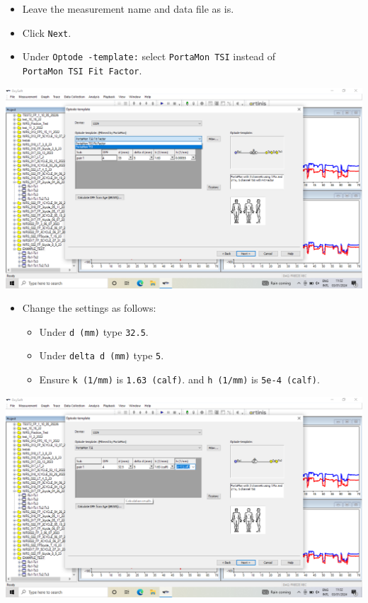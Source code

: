 \documentclass[
]{book}
\providecommand{\tightlist}{%
  \setlength{\itemsep}{0pt}\setlength{\parskip}{0pt}}
\begin{document}
\begin{itemize}
\tightlist
\item
  Leave the measurement name and data file as is.
\item
  Click \texttt{Next}.
\item
  Under \texttt{Optode\ -template:} select \texttt{PortaMon\ TSI} instead of \texttt{PortaMon\ TSI\ Fit\ Factor}.
\end{itemize}

\includegraphics[width=1\linewidth]{images/changemeasurementproperties/select_tsi}

\begin{itemize}
\tightlist
\item
  Change the settings as follows:

  \begin{itemize}
  \tightlist
  \item
    Under \texttt{d\ (mm)} type \texttt{32.5}.
  \item
    Under \texttt{delta\ d\ (mm)} type \texttt{5}.
  \item
    Ensure \texttt{k\ (1/mm)} is \texttt{1.63\ (calf)}. and \texttt{h\ (1/mm)} is \texttt{5e-4\ (calf)}.
  \end{itemize}
\end{itemize}

\includegraphics[width=1\linewidth]{images/changemeasurementproperties/tsi_template_settings}
\end{document}
